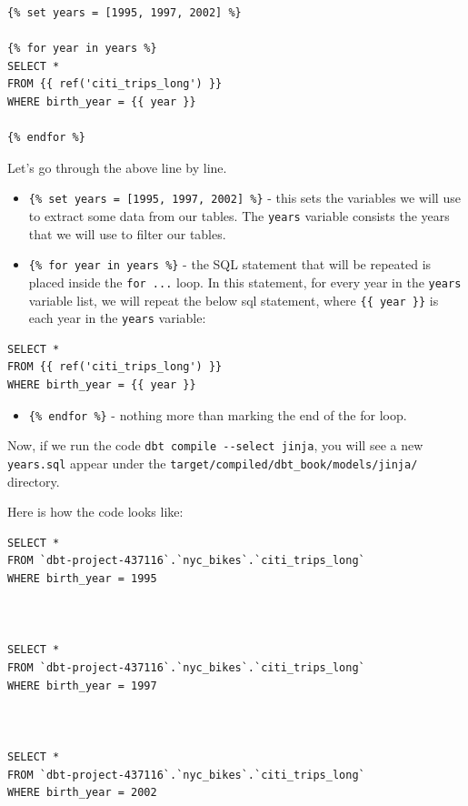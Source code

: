 \documentclass[
]{book}
\providecommand{\tightlist}{%
  \setlength{\itemsep}{0pt}\setlength{\parskip}{0pt}}
\begin{document}
\begin{verbatim}
{% set years = [1995, 1997, 2002] %}

{% for year in years %}
SELECT * 
FROM {{ ref('citi_trips_long') }}
WHERE birth_year = {{ year }}

{% endfor %}
\end{verbatim}

Let's go through the above line by line.

\begin{itemize}
\item
  \texttt{\{\%\ set\ years\ =\ {[}1995,\ 1997,\ 2002{]}\ \%\}} - this sets the variables we will use to extract some data from our tables. The \texttt{years} variable consists the years that we will use to filter our tables.
\item
  \texttt{\{\%\ for\ year\ in\ years\ \%\}} - the SQL statement that will be repeated is placed inside the \texttt{for\ ...} loop. In this statement, for every year in the \texttt{years} variable list, we will repeat the below sql statement, where \texttt{\{\{\ year\ \}\}} is each year in the \texttt{years} variable:
\end{itemize}

\begin{verbatim}
SELECT * 
FROM {{ ref('citi_trips_long') }}
WHERE birth_year = {{ year }}
\end{verbatim}

\begin{itemize}
\tightlist
\item
  \texttt{\{\%\ endfor\ \%\}} - nothing more than marking the end of the for loop.
\end{itemize}

Now, if we run the code \texttt{dbt\ compile\ -\/-select\ jinja}, you will see a new \texttt{years.sql} appear under the \texttt{target/compiled/dbt\_book/models/jinja/} directory.

Here is how the code looks like:

\begin{verbatim}
SELECT * 
FROM `dbt-project-437116`.`nyc_bikes`.`citi_trips_long`
WHERE birth_year = 1995



SELECT * 
FROM `dbt-project-437116`.`nyc_bikes`.`citi_trips_long`
WHERE birth_year = 1997



SELECT * 
FROM `dbt-project-437116`.`nyc_bikes`.`citi_trips_long`
WHERE birth_year = 2002
\end{verbatim}
\end{document}
